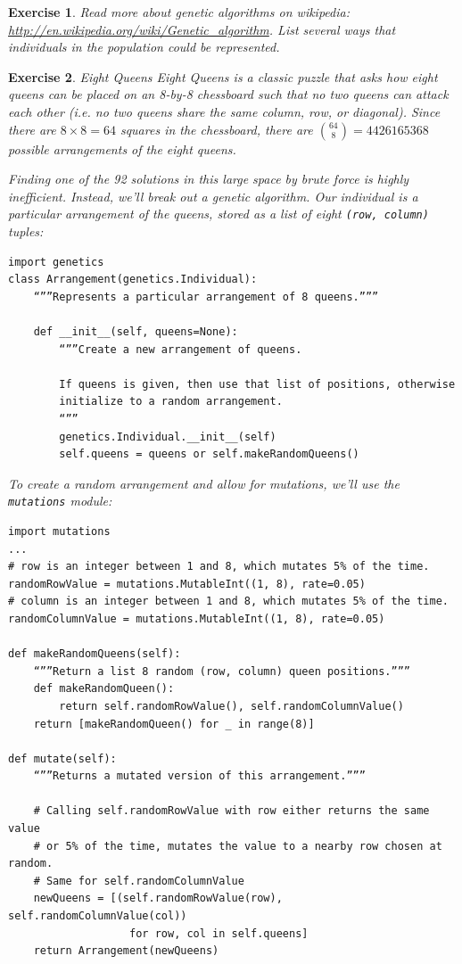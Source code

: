\documentclass[12pt]{article}
\newtheorem{ex}{Exercise}
\begin{document}
\begin{ex}
Read more about genetic algorithms on wikipedia: \url{http://en.wikipedia.org/wiki/Genetic_algorithm}. List several ways that individuals in the population could be represented.
\end{ex}

\begin{ex} Eight Queens
Eight Queens is a classic puzzle that asks how eight queens can be placed on an 8-by-8 chessboard such that no two queens can attack each other (i.e. no two queens share the same column, row, or diagonal). Since there are $8 \times 8 = 64$ squares in the chessboard, there are ${64 \choose 8} = 4426165368$ possible arrangements of the eight queens. 

Finding one of the 92 solutions in this large space by brute force is highly inefficient. Instead, we’ll break out a genetic algorithm. Our individual is a particular arrangement of the queens, stored as a list of eight \verb|(row, column)| tuples:

\begin{verbatim}
import genetics
class Arrangement(genetics.Individual):
	“””Represents a particular arrangement of 8 queens.”””
	
	def __init__(self, queens=None):
		“””Create a new arrangement of queens.

		If queens is given, then use that list of positions, otherwise
		initialize to a random arrangement.
		“””
		genetics.Individual.__init__(self)
		self.queens = queens or self.makeRandomQueens()
\end{verbatim}

To create a random arrangement and allow for mutations, we’ll use the \verb|mutations| module:
\begin{verbatim}
import mutations
...
# row is an integer between 1 and 8, which mutates 5% of the time.
randomRowValue = mutations.MutableInt((1, 8), rate=0.05)
# column is an integer between 1 and 8, which mutates 5% of the time.
randomColumnValue = mutations.MutableInt((1, 8), rate=0.05)

def makeRandomQueens(self):
	“””Return a list 8 random (row, column) queen positions.”””
	def makeRandomQueen():
		return self.randomRowValue(), self.randomColumnValue()
	return [makeRandomQueen() for _ in range(8)]

def mutate(self):
	“””Returns a mutated version of this arrangement.”””
	
	# Calling self.randomRowValue with row either returns the same value
	# or 5% of the time, mutates the value to a nearby row chosen at random.
	# Same for self.randomColumnValue
	newQueens = [(self.randomRowValue(row), self.randomColumnValue(col))
                   for row, col in self.queens]
	return Arrangement(newQueens)
\end{verbatim}


\end{ex}
\end{document}

